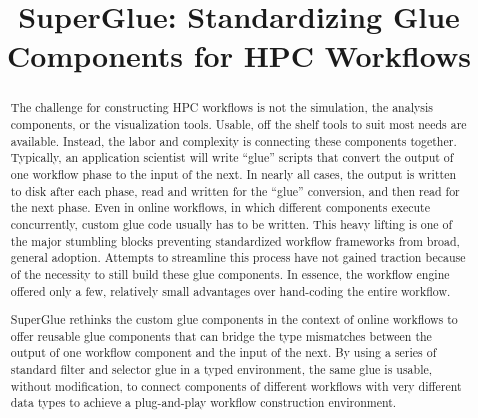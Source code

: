 \documentclass[conference]{IEEEtran}
\begin{document}
\title{SuperGlue: Standardizing Glue Components for HPC Workflows}

\author{

}

\maketitle

\begin{abstract}

The challenge for constructing HPC workflows is not the simulation, the
analysis components, or the visualization tools. Usable, off the shelf tools to
suit most needs are available. Instead, the labor and complexity is connecting
these components together. Typically, an application scientist will write
``glue'' scripts that convert the output of one workflow phase to the input of
the next.  In nearly all cases, the output is written to disk after each
phase, read and written for the ``glue'' conversion, and then read for the next
phase. Even in online workflows, in which different components execute concurrently,
custom glue code usually has to be written.
This heavy lifting is one of the major stumbling blocks preventing
standardized workflow frameworks from broad, general adoption. Attempts to
streamline this process have not gained traction because of the necessity to
still build these glue components. In essence, the workflow engine offered only
a few, relatively small advantages over hand-coding the entire workflow.

SuperGlue rethinks the custom glue components in the context of online
workflows to offer reusable glue components that can bridge the type mismatches
between the output of one workflow component and the input of the next. By
using a series of standard filter and selector glue in a typed environment, the
same glue is usable, without modification, to connect components of different
workflows with very different data types to achieve a plug-and-play workflow
construction environment.

\end{abstract}

\end{document}
